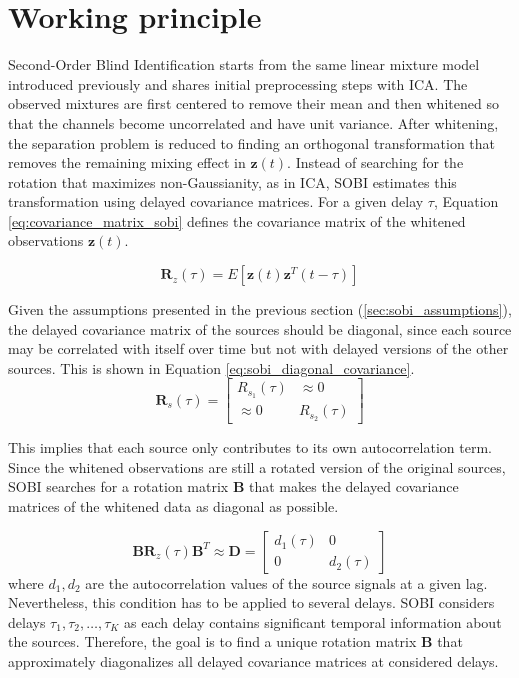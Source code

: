   

\section{Working principle}

Second-Order Blind Identification starts from the same linear mixture model introduced previously and shares initial preprocessing steps with ICA. The observed mixtures are first centered to remove their mean and then whitened so that the channels become uncorrelated and have unit variance. After whitening, the separation problem is reduced to finding an orthogonal transformation that removes the remaining mixing effect in $\mathbf{z}(t)$. Instead of searching for the rotation that maximizes non-Gaussianity, as in ICA, SOBI estimates this transformation using delayed covariance matrices. For a given delay $\tau$, Equation \ref{eq:covariance_matrix_sobi} defines the covariance matrix of the whitened observations $\mathbf{z}(t)$.

\begin{equation}
    \mathbf{R}_z(\tau) = E\left[\mathbf{z}(t)\mathbf{z}^T(t-\tau)\right]\label{eq:covariance_matrix_sobi}
\end{equation}

Given the assumptions presented in the previous section (\ref{sec:sobi_assumptions}), the delayed covariance matrix of the sources should be diagonal, since each source may be correlated with itself over time but not with delayed versions of the other sources. This is shown in Equation \ref{eq:sobi_diagonal_covariance}.
\begin{equation}
    \mathbf{R}_s(\tau) =
\begin{bmatrix}
R_{s_1}(\tau) & \approx0 \\
\approx0 & R_{s_2}(\tau)
\end{bmatrix}
\label{eq:sobi_diagonal_covariance}
\end{equation}

This implies that each source only contributes to its own autocorrelation term. Since the whitened observations are still a rotated version of the original sources, SOBI searches for a rotation matrix $\mathbf{B}$ that makes the delayed covariance matrices of the whitened data as diagonal as possible. 

\begin{equation}
    \mathbf{B}\mathbf{R}_z(\tau)\mathbf{B}^T \approx \mathbf{D}=\begin{bmatrix}
        d_1(\tau) & 0 \\
        0 &d_2(\tau)
    \end{bmatrix}
\end{equation}
where $d_1,d_2$ are the autocorrelation values of the source signals at a given lag. Nevertheless, this condition has to be applied to several delays. SOBI considers delays $\tau_1,\tau_2,\dots,\tau_K$ as each delay contains significant temporal information about the sources. Therefore, the goal is to find a unique rotation matrix $\mathbf{B}$ that approximately diagonalizes all delayed covariance matrices at considered delays. 


